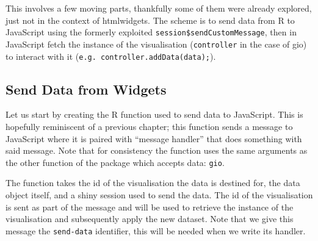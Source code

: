 \documentclass[
]{krantz}
\makeatletter
\newenvironment{Shaded}{\begin{snugshade}}{\end{snugshade}}
\newcommand{\CommentTok}[1]{\textcolor[rgb]{0.37,0.37,0.37}{\textit{#1}}}
\newcommand{\ControlFlowTok}[1]{\textcolor[rgb]{0.27,0.27,0.27}{\textbf{#1}}}
\newcommand{\DataTypeTok}[1]{\textcolor[rgb]{0.27,0.27,0.27}{#1}}
\newcommand{\KeywordTok}[1]{\textcolor[rgb]{0.27,0.27,0.27}{\textbf{#1}}}
\newcommand{\NormalTok}[1]{#1}
\newcommand{\OperatorTok}[1]{\textcolor[rgb]{0.43,0.43,0.43}{\textbf{#1}}}
\newcommand{\StringTok}[1]{\textcolor[rgb]{0.5,0.5,0.5}{#1}}
\newenvironment{kframe}{%
\medskip{}
\setlength{\fboxsep}{.8em}
 \def\at@end@of@kframe{}%
 \ifinner\ifhmode%
  \def\at@end@of@kframe{\end{minipage}}%
  \begin{minipage}{\columnwidth}%
 \fi\fi%
 \def\FrameCommand##1{\hskip\@totalleftmargin \hskip-\fboxsep
 \colorbox{shadecolor}{##1}\hskip-\fboxsep
     \hskip-\linewidth \hskip-\@totalleftmargin \hskip\columnwidth}%
 \MakeFramed {\advance\hsize-\width
   \@totalleftmargin\z@ \linewidth\hsize
   \@setminipage}}%
 {\par\unskip\endMakeFramed%
 \at@end@of@kframe}
\renewenvironment{Shaded}{\begin{kframe}}{\end{kframe}}
\makeatother
\begin{document}
This involves a few moving parts, thankfully some of them were already explored, just not in the context of htmlwidgets. The scheme is to send data from R to JavaScript using the formerly exploited \texttt{session\$sendCustomMessage}, then in JavaScript fetch the instance of the visualisation (\texttt{controller} in the case of gio) to interact with it (\texttt{e.g.\ controller.addData(data);}).

\hypertarget{shiny-widgets-send-data}{%
\subsection{Send Data from Widgets}\label{shiny-widgets-send-data}}

Let us start by creating the R function used to send data to JavaScript. This is hopefully reminiscent of a previous chapter; this function sends a message to JavaScript where it is paired with ``message handler'' that does something with said message. Note that for consistency the function uses the same arguments as the other function of the package which accepts data: \texttt{gio}.

\begin{Shaded}
\end{Shaded}

The function takes the id of the visualisation the data is destined for, the data object itself, and a shiny session used to send the data. The id of the visualisation is sent as part of the message and will be used to retrieve the instance of the visualisation and subsequently apply the new dataset. Note that we give this message the \texttt{send-data} identifier, this will be needed when we write its handler.
\end{document}
